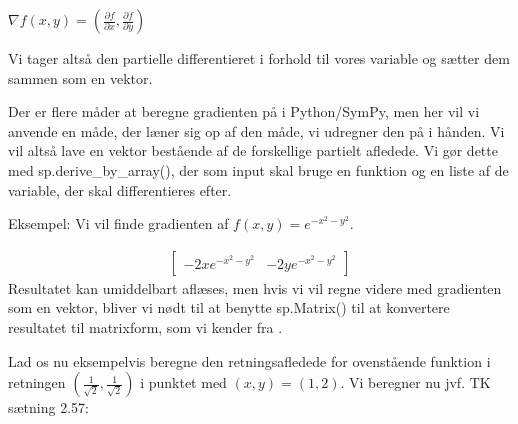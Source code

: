 \documentclass[letterpaper,10pt,english]{jupyterBook}
\begin{document}
\(\nabla f(x,y) = \left(\frac{\partial f}{\partial x}, \frac{\partial f}{\partial y}\right)\)

Vi tager altså den partielle differentieret i forhold til vores variable og sætter dem sammen som en vektor.

Der er flere måder at beregne gradienten på i Python/SymPy, men her vil vi anvende en måde, der læner sig op af den måde, vi udregner den på i hånden. Vi vil altså lave en vektor bestående af de forskellige partielt afledede. Vi gør dette med sp.derive\_by\_array(), der som input skal bruge en funktion og en liste af de variable, der skal differentieres efter.

Eksempel: Vi vil finde gradienten af \(f(x,y) = e^{- x^2 - y^2}\).

\begin{sphinxVerbatim}[commandchars=\\\{\}]
         

   \PYG{p}{[} \PYG{p}{]}
\end{sphinxVerbatim}
\begin{equation*}
\begin{split}\displaystyle \left[\begin{matrix}- 2 x e^{- x^{2} - y^{2}} & - 2 y e^{- x^{2} - y^{2}}\end{matrix}\right]\end{split}
\end{equation*}
Resultatet kan umiddelbart aflæses, men hvis vi vil regne videre med gradienten som en vektor, bliver vi nødt til at benytte sp.Matrix() til at konvertere resultatet til matrixform, som vi kender fra {\hyperref[\detokenize{notebooks/sympy/Notebook_LinAlg1::doc}]{}}.

Lad os nu eksempelvis beregne den retningsafledede for ovenstående funktion i retningen \(\left(\frac{1}{\sqrt{2}},\frac{1}{\sqrt{2}}\right)\) i punktet med \((x, y) = (1, 2)\). Vi beregner nu jvf. TK sætning 2.57:
\end{document}
